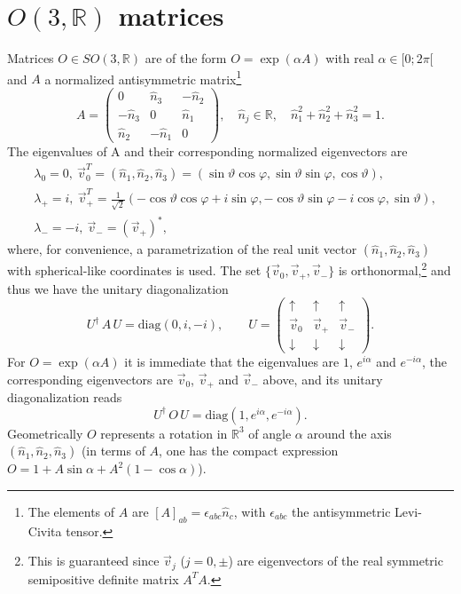 \documentclass[12pt,a4paper]{article}
\begin{document}
\section{$O(3,\mathbb{R})$ matrices\label{APP:O3}}
Matrices $O\in SO(3,\mathbb{R})$ are of the form $O=\exp (\alpha A)$ with real $\alpha\in[0;2\pi[$ and $A$ a normalized antisymmetric matrix\footnote{The elements of $A$ are $[A]_{ab}=\epsilon_{abc}\hat n_c$, with $\epsilon_{abc}$ the antisymmetric Levi-Civita tensor.}
\begin{equation}\label{eq:O3:A:00}
 A=\begin{pmatrix} 0&\hat n_3& -\hat n_2\\ -\hat n_3&0&\hat n_1\\ \hat n_2&-\hat n_1&0\end{pmatrix},\quad \hat n_j\in\mathbb{R},\quad 
 \hat n_1^2+\hat n_2^2+\hat n_3^2=1.
\end{equation}
The eigenvalues of A and their corresponding normalized eigenvectors are
\begin{equation}
 \begin{aligned}
   &\lambda_0=0,\ \vec v_{0}^T=(\hat n_1,\hat n_2,\hat n_3)=(\sin\vartheta\cos\varphi,\sin\vartheta\sin\varphi,\cos\vartheta),\\
   &\lambda_{+}=i,\ \vec v_{+}^T=\frac{1}{\sqrt 2}(-\cos\vartheta\cos\varphi+i\sin\varphi,-\cos\vartheta\sin\varphi-i\cos\varphi,\sin\vartheta),\\
   &\lambda_{-}=-i,\ \vec v_{-}=(\vec v_{+})^\ast,
 \end{aligned}
\end{equation}
where, for convenience, a parametrization of the real unit vector $(\hat n_1,\hat n_2,\hat n_3)$ with spherical-like coordinates is used. The set $\{\vec v_0,\vec v_+,\vec v_-\}$ is orthonormal,\footnote{This is guaranteed since $\vec v_j$ ($j=0,\pm$) are eigenvectors of the real symmetric semipositive definite matrix $A^TA$.} and thus we have the unitary diagonalization
\begin{equation}
 U^\dagger\,A\,U=\text{diag}(0,i,-i),\qquad 
 U=\begin{pmatrix}\uparrow &\uparrow&\uparrow\\ \vec v_0&\vec v_+&\vec v_-\\ \downarrow&\downarrow&\downarrow\end{pmatrix}.
\end{equation}
For $O=\exp(\alpha A)$ it is immediate that the eigenvalues are $1$, $e^{i\alpha}$ and $e^{-i\alpha}$, the corresponding eigenvectors are $\vec v_0$, $\vec v_+$ and $\vec v_-$ above, and its unitary diagonalization reads
\begin{equation}
U^\dagger\,O\,U= \text{diag}(1,e^{i\alpha},e^{-i\alpha}).
\end{equation}
Geometrically $O$ represents a rotation in $\mathbb{R}^3$ of angle $\alpha$ around the axis $(\hat n_1,\hat n_2,\hat n_3)$ (in terms of $A$, one has the compact expression $O=1+A\sin\alpha+A^2(1-\cos\alpha)$).
\end{document}
